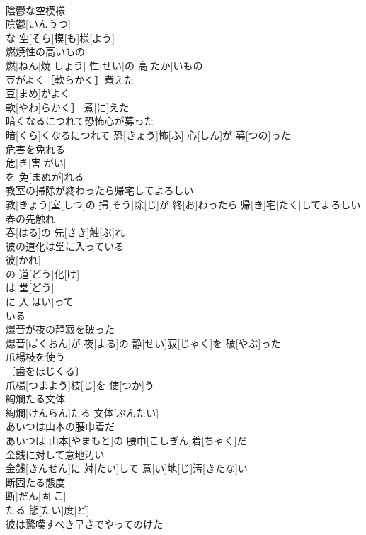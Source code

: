\documentclass[8pt]{extreport}
\begin{document}
\begin{CJK}{UTF8}{min}
\\	陰鬱な空模様	
\\	陰鬱[いんうつ]
\\	な 空[そら]模[も]様[よう]
\\	燃焼性の高いもの	
\\	燃[ねん]焼[しょう] 性[せい]の 高[たか]いもの
\\	豆がよく［軟らかく］煮えた	
\\	豆[まめ]がよく
\\	軟[やわ]らかく］ 煮[に]えた
\\	暗くなるにつれて恐怖心が募った	
\\	暗[くら]くなるにつれて 恐[きょう]怖[ふ] 心[しん]が 募[つの]った
\\	危害を免れる	
\\	危[き]害[がい]
\\	を 免[まぬが]れる 
\\	教室の掃除が終わったら帰宅してよろしい	
\\	教[きょう]室[しつ]の 掃[そう]除[じ]が 終[お]わったら 帰[き]宅[たく]してよろしい
\\	春の先触れ	
\\	春[はる]の 先[さき]触[ぶ]れ
\\	彼の道化は堂に入っている	
\\	彼[かれ]
\\	の 道[どう]化[け]
\\	は 堂[どう]
\\	に 入[はい]って 
\\	いる 
\\	爆音が夜の静寂を破った	
\\	爆音[ばくおん]が 夜[よる]の 静[せい]寂[じゃく]を 破[やぶ]った
\\	爪楊枝を使う	
\\	〔歯をほじくる〕
\\	爪楊[つまよう]枝[じ]を 使[つか]う
\\	絢爛たる文体	
\\	絢爛[けんらん]たる 文体[ぶんたい]
\\	あいつは山本の腰巾着だ	
\\	あいつは 山本[やまもと]の 腰巾[こしぎん]着[ちゃく]だ
\\	金銭に対して意地汚い	
\\	金銭[きんせん]に 対[たい]して 意[い]地[じ]汚[きたな]い
\\	断固たる態度	
\\	断[だん]固[こ]
\\	たる 態[たい]度[ど]
\\	彼は驚嘆すべき早さでやってのけた	

\end{CJK}
\end{document}
